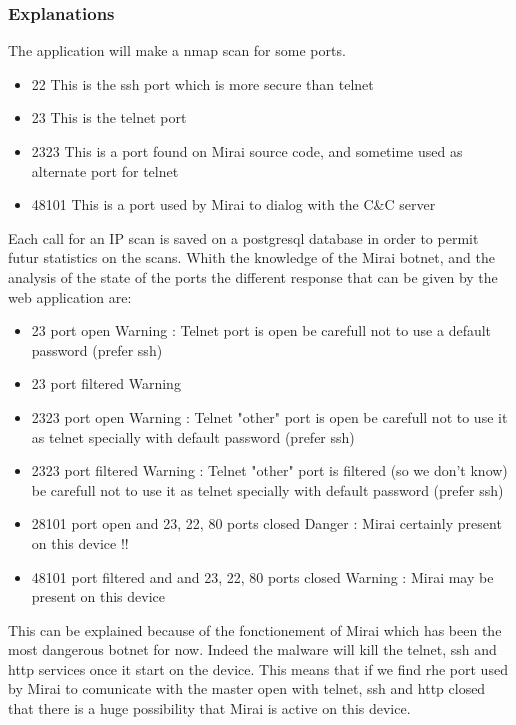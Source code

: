 \documentclass{report}
\begin{document}
\subsubsection{Explanations}
The application will make a nmap scan for some ports.
\begin{itemize}
 \item 22 This is the ssh port which is more secure than telnet
 \item 23 This is the telnet port
 \item 2323 This is a port found on Mirai source code, and sometime used as alternate port for telnet
 \item 48101 This is a port used by Mirai to dialog with the C\&C server
\end{itemize}
Each call for an IP scan is saved on a postgresql database in order to permit futur statistics on the scans. Whith the knowledge of the Mirai botnet, and the analysis of the state of the ports the different response that can be given by the web application are:
\begin{itemize}
\item 23 port open\newline
  Warning : Telnet port is open be carefull not to use a default password (prefer ssh)
\item 23 port filtered\newline
  Warning
\item 2323 port open\newline
  Warning : Telnet "other" port is open be carefull not to use it as telnet specially with default password (prefer ssh)
\item 2323 port filtered\newline
  Warning : Telnet "other" port is filtered (so we don't know) be carefull not to use it as telnet specially with default password (prefer ssh)
\item 28101 port open and 23, 22, 80 ports closed\newline
  Danger : Mirai certainly present on this device !!
\item 48101 port filtered and and 23, 22, 80 ports closed\newline
  Warning : Mirai may be present on this device
\end{itemize}
This can be explained because of the fonctionement of Mirai which has been the most dangerous botnet for now. Indeed the malware will kill the telnet, ssh and http services once it start on the device. This means that if we find rhe port used by Mirai to comunicate with the master open  with telnet, ssh and http closed that there is a huge possibility that Mirai is active on this device.
\end{document}
